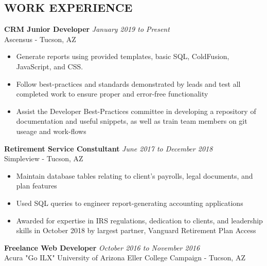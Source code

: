 \documentclass[10pt]{res} %
\begin{document}
 
 
\address{Tucson, AZ $|$ xmclallen@gmail.com $|$ (910) 916-0948}        
         
                        
\begin{resume}                         

\section{WORK EXPERIENCE}
\vspace{4pt}
  {\bf CRM Junior Developer} \hfill  {\sl January 2019 to Present}\\
  Ascensus - Tucson, AZ
  
   \begin{itemize} %
   \item Generate reports using provided templates, basic SQL, ColdFusion, JavaScript, and CSS.
   \item Follow best-practices and standards demonstrated by leads and test all completed work to ensure proper and error-free functionality
   \item Assist the Developer Best-Practices committee in developing a repository of documentation and useful snippets, as well as train team members on git useage and work-flows
   \end{itemize}


  {\bf Retirement Service Constultant} \hfill  {\sl June 2017 to December 2018}\\
  Simpleview - Tucson, AZ
  
   \begin{itemize} %
   \item Maintain database tables relating to client’s payrolls, legal documents, and plan features
   \item Used SQL queries to engineer report-generating accounting applications
   \item Awarded for expertise in IRS regulations, dedication to clients, and leadership skills in October 2018 by largest partner, Vanguard Retirement Plan Access
   \end{itemize}


  {\bf Freelance Web Developer} \hfill  {\sl October 2016 to November 2016}\\
  Acura "Go ILX" University of Arizona Eller College Campaign - Tucson, AZ
  

\end{resume}
\end{document}
